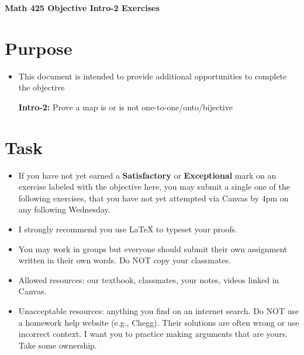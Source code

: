 \documentclass[12pt]{article}
\begin{document}
	\begin{center}
		{\Large \bf Math 425 Objective Intro-2 Exercises}
	\end{center}
	\section*{Purpose}
	\begin{itemize}
		\item This document is intended to provide additional opportunities to complete the objective
		
		\textbf{Intro-2:} Prove a map is or is not one-to-one/onto/bijective
	\end{itemize}
	\section*{Task}
	\begin{itemize}
		\item If you have not yet earned a \textbf{Satisfactory} or \textbf{Exceptional} mark on an exercise labeled with the objective here, you may submit a single one of the following exercises, that you have not yet attempted via Canvas by 4pm on any following Wednesday.
		\item I strongly recommend you use LaTeX to typeset your proofs.
		\item You may work in groups but everyone should submit their own assignment written in their own words.  Do NOT copy your classmates.
		\item Allowed resources: our textbook, classmates, your notes, videos linked in Canvas.
		\item Unacceptable resources: anything you find on an internet search. Do NOT use a homework help website (e.g., Chegg). Their solutions are often wrong or use incorrect context.  I want you to practice making arguments that are yours. Take some ownership.
	\end{itemize}
\end{document}
